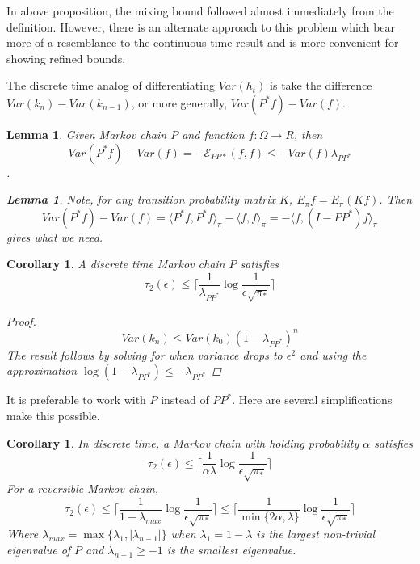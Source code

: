 \documentclass[12pt,reqno]{amsart}
\newtheorem{cor}[thm]{Corollary}
\newtheorem{lem}[thm]{Lemma}
\begin{document}
In above proposition, the mixing bound followed almost immediately from the definition. However, there is an alternate approach to this problem which bear more of a resemblance to the continuous time result and is more convenient for showing refined bounds.

The discrete time analog of differentiating $Var(h_t)$ is take the difference 
$Var(k_n)-Var(k_{n-1})$, or more generally, $Var(P^*f)-Var(f)$.

\begin{lem}
  Given Markov chain $P$ and function $f:\Omega \rightarrow R$, then
  $$Var(P^*f)-Var(f) = -\mathcal{E}_{PP*}(f,f) \leq -Var(f)\lambda_{PP^*}$$.
  \begin{lem}
    Note, for any transition probability matrix $K$, $E_{\pi}f = E_{\pi}(Kf)$. Then
$$Var(P^*f)-Var(f)=\langle P^*f,P^*f \rangle_{\pi} - \langle f,f \rangle_{\pi} 
= -\langle f,(I-PP^*)f \rangle_{\pi}
$$
gives what we need.
  \end{lem}
\end{lem}


\begin{cor}
  A discrete time Markov chain $P$ satisfies 
  \begin{equation}
    \label{eq:discrere_bound_2}
    \tau_2(\epsilon) \leq \lceil \frac{1}{\lambda_{PP^*}} \log \frac{1}{\epsilon \sqrt{\pi_*}} \rceil
  \end{equation}

  \begin{proof}
    \begin{equation}
      Var(k_n)\leq Var(k_0)(1-\lambda_{PP^*})^n
    \end{equation}
The result follows by solving for when variance drops to $\epsilon^2$ and using
the approximation $\log(1-\lambda_{PP^*}) \leq -\lambda_{PP^*}$
  \end{proof}
\end{cor}

It is preferable to work with $P$ instead of $PP^*$. Here are several simplifications make this possible.

\begin{cor}
In discrete time, a Markov chain with holding probability $\alpha$ satisfies
  \begin{equation}
        \tau_2(\epsilon) \leq \lceil \frac{1}{\alpha\lambda} \log \frac{1}{\epsilon \sqrt{\pi_*}} \rceil
  \end{equation}
For a reversible Markov chain,
  \begin{equation}
      \tau_2(\epsilon) \leq \lceil \frac{1}{1-\lambda_{max}} \log \frac{1}{\epsilon \sqrt{\pi_*}} \rceil   \leq \lceil \frac{1}{\min\{2\alpha,\lambda\}} \log \frac{1}{\epsilon \sqrt{\pi_*}} \rceil 
  \end{equation}
Where $\lambda_{max} = \max\{\lambda_1,|\lambda_{n-1}|\}$ when $\lambda_1 = 1 - \lambda$ is the largest non-trivial eigenvalue of $P$ and $\lambda_{n-1}\geq -1$ is the smallest eigenvalue. 
\end{cor}
\end{document}
